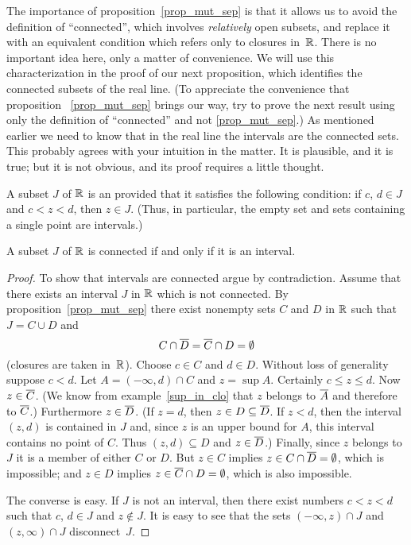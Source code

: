 The importance of proposition~\ref{prop_mut_sep} is that it allows us to avoid the definition
of ``connected'', which involves \emph{relatively} open subsets, and replace it with an
equivalent condition which refers only to closures in~$\mathbb{R}$.  There is no important idea here,
only a matter of convenience.  We will use this characterization in the proof of our next
proposition, which identifies the connected subsets of the real line.  (To appreciate the
convenience that proposition ~\ref{prop_mut_sep} brings our way, try to prove the next result
using only the definition of ``connected'' and not \ref{prop_mut_sep}.)  As mentioned earlier
we need to know that in the real line the intervals are the connected sets.  This probably
agrees with your intuition in the matter.  It is plausible, and it is true; but it is not
obvious, and its proof requires a little thought.

\begin{defn} A subset $J$ of $\mathbb{R}$ is an
 provided that it satisfies the following condition: if $c$, $d \in J$ and $c < z
< d$, then $z \in J$. (Thus, in particular, the empty set and sets containing a single point
are intervals.)
\end{defn}

\begin{prop}\label{prop_conn_int}  A subset $J$ of $\mathbb{R}$ is connected if and only if it is
an interval.
\end{prop}

\begin{proof} To show that intervals are connected argue by contradiction. Assume that there
exists an interval $J$ in $\mathbb{R}$ which is not connected.  By proposition~\ref{prop_mut_sep}
there exist nonempty sets $C$ and $D$ in $\mathbb{R}$ such that $J = C \cup D$ and
    \[ C \cap \overline{D} = \overline{C} \cap D = \emptyset \]
(closures are taken in~$\mathbb{R}$).  Choose $c \in C$ and $d \in D$. Without loss of generality
suppose $c < d$. Let $A = (-\infty, d) \cap C$ and $z = \sup A$.  Certainly $c \le z \le d$.
Now $z \in \overline{C}$. (We know from example~\ref{sup_in_clo} that $z$ belongs to $\overline{A}$ and
therefore to $\overline{C}$.)   Furthermore $z \in \overline{D}$. (If $z = d$, then $z \in D \subseteq
\overline{D}$.  If $z < d$, then the interval $(z,d)$ is contained in $J$ and, since $z$ is an upper
bound for $A$, this interval contains no point of $C$. Thus $(z,d) \subseteq D$ and $z \in
\overline{D}$.)  Finally, since $z$ belongs to $J$ it is a member of either $C$ or $D$. But $z \in
C$ implies $z \in C \cap \overline{D} = \emptyset$, which is impossible; and $z \in D$ implies $z
\in \overline{C} \cap D = \emptyset$, which is also impossible.

The converse is easy. If $J$ is not an interval, then there exist numbers $c < z < d$ such
that $c$, $d \in J$ and $z \notin J$. It is easy to see that the sets $(-\infty, z) \cap J$
and $(z, \infty) \cap J$ disconnect~$J$.
\end{proof}


